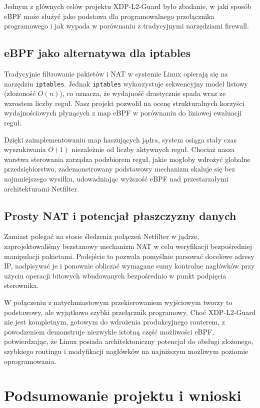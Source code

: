 \documentclass[11pt,a4paper]{article}
\begin{document}
Jednym z głównych celów projektu XDP-L2-Guard było zbadanie, w jaki sposób eBPF może służyć jako podstawa dla programowalnego przełącznika programowego i jak wypada w porównaniu z tradycyjnymi narzędziami firewall.

\subsection{eBPF jako alternatywa dla iptables}

Tradycyjnie filtrowanie pakietów i NAT w systemie Linux opierają się na narzędziu \texttt{iptables}. Jednak \texttt{iptables} wykorzystuje sekwencyjny model listowy (złożoność $O(n)$), co oznacza, że wydajność drastycznie spada wraz ze wzrostem liczby reguł. Nasz projekt pozwolił na ocenę strukturalnych korzyści wydajnościowych płynących z map eBPF w porównaniu do liniowej ewaluacji reguł.

Dzięki zaimplementowaniu map haszujących jądra, system osiąga stały czas wyszukiwania $O(1)$ niezależnie od liczby aktywnych reguł. Chociaż nasza warstwa sterowania zarządza podzbiorem reguł, jakie mogłoby wdrożyć globalne przedsiębiorstwo, zademonstrowany podstawowy mechanizm skaluje się bez najmniejszego wysiłku, udowadniając wyższość eBPF nad przestarzałymi architekturami Netfilter.

\subsection{Prosty NAT i potencjał płaszczyzny danych}

Zamiast polegać na stosie śledzenia połączeń Netfilter w jądrze, zaprojektowaliśmy bezstanowy mechanizm NAT w celu weryfikacji bezpośredniej manipulacji pakietami. Podejście to pozwala pomyślnie parsować docelowe adresy IP, nadpisywać je i ponownie obliczać wymagane sumy kontrolne nagłówków przy użyciu operacji bitowych wbudowanych bezpośrednio w punkt podpięcia sterownika.

W połączeniu z natychmiastowym przekierowaniem wyjściowym tworzy to podstawowy, ale wyjątkowo szybki przełącznik programowy. Choć XDP-L2-Guard nie jest kompletnym, gotowym do wdrożenia produkcyjnego routerem, z powodzeniem demonstruje niezwykle istotną część możliwości eBPF, potwierdzając, że Linux posiada architektoniczny potencjał do obsługi złożonego, szybkiego routingu i modyfikacji nagłówków na najniższym możliwym poziomie oprogramowania.

\section{Podsumowanie projektu i wnioski}
\end{document}
